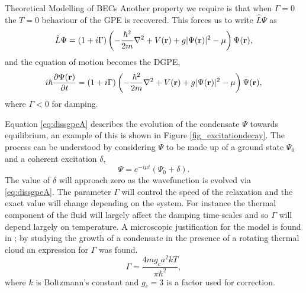 \begin{chapter}{\label{cha:theoretical_model}Theoretical Modelling of BECs}
	Another property we require is that when $\Gamma=0$ the $T=0$ behaviour of the GPE is recovered. This forces us to write $\hat{L}\Psi$ as
	\begin{equation*}\label{eq:dissantiherm2}
		\hat{L}\Psi = (1+i\Gamma)\left( -\frac{\hbar^2}{2m}\nabla^2 + V({\bf r}) + g|\Psi({\bf r})|^2 - \mu \right) \Psi({\bf r}),
	\end{equation*}
	and the equation of motion becomes the DGPE,
	\begin{equation}\label{eq:dissgpeA}
		i\hbar \frac{\partial \Psi({\bf r})}{\partial t} = (1+i\Gamma)\left( -\frac{\hbar^2 }{2m}\nabla^2 + V({\bf r}) + g|\Psi({\bf r})|^2- \mu \right) \Psi({\bf r}),
	\end{equation}
	where $\Gamma<0$ for damping.

	Equation \ref{eq:dissgpeA} describes the evolution of the condensate $\Psi$ towards equilibrium, an example of this is shown in Figure \ref{fig_excitationdecay}. The process can be understood by considering $\Psi$ to be made up of a ground state $\Psi_0$ and a coherent excitation $\delta$,
	\begin{equation*}\label{eq:dissantiherm2}
		\Psi = e^{-i \mu t}(\Psi_0 + \delta).
	\end{equation*}
	The value of $\delta$ will approach zero as the wavefunction is evolved via \ref{eq:dissgpeA}. The parameter $\Gamma$ will control the speed of the relaxation and the exact value will change depending on the system. For instance the thermal component of the fluid will largely affect the damping time-scales and so $\Gamma$ will depend largely on temperature. A microscopic justification for the model is found in \cite{penckwitt_2002, gardiner97}; by studying the growth of a condensate in the presence of a rotating thermal cloud an expression for $\Gamma$ was found.
		\begin{equation}\label{eq:dissgamma}
		\Gamma = \frac{4mg_ca^2kT}{\pi\hbar^2},
		\end{equation}
	where $k$ is Boltzmann's constant and $g_c = 3$ is a factor used for correction.
\begin{figure}[!ht]
	\centering
   \begin{tikzpicture}

\end{tikzpicture}
\end{figure}
\end{chapter}
